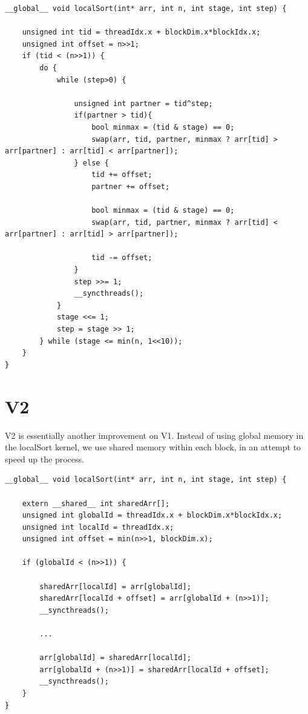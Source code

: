 \documentclass[12pt]{report}
\begin{document}
\begin{lstlisting}[style=cstyle]
__global__ void localSort(int* arr, int n, int stage, int step) {

    unsigned int tid = threadIdx.x + blockDim.x*blockIdx.x;
    unsigned int offset = n>>1;
    if (tid < (n>>1)) {
        do {
            while (step>0) {
                
                unsigned int partner = tid^step;
                if(partner > tid){
                    bool minmax = (tid & stage) == 0;
                    swap(arr, tid, partner, minmax ? arr[tid] > arr[partner] : arr[tid] < arr[partner]);
                } else {
                    tid += offset;
                    partner += offset;

                    bool minmax = (tid & stage) == 0;
                    swap(arr, tid, partner, minmax ? arr[tid] < arr[partner] : arr[tid] > arr[partner]);

                    tid -= offset;
                }
                step >>= 1;
                __syncthreads();
            }
            stage <<= 1;
            step = stage >> 1;
        } while (stage <= min(n, 1<<10));
    }
}
\end{lstlisting}

\section{V2}

V2 is essentially another improvement on V1. Instead of using global memory in the localSort kernel, we use shared memory within each block, in an attempt to speed up the process.

\begin{lstlisting}[style=cstyle]
__global__ void localSort(int* arr, int n, int stage, int step) {

    extern __shared__ int sharedArr[];
    unsigned int globalId = threadIdx.x + blockDim.x*blockIdx.x;
    unsigned int localId = threadIdx.x;
    unsigned int offset = min(n>>1, blockDim.x);

    if (globalId < (n>>1)) {
        
        sharedArr[localId] = arr[globalId];
        sharedArr[localId + offset] = arr[globalId + (n>>1)];
        __syncthreads(); 

        ...

        arr[globalId] = sharedArr[localId];
        arr[globalId + (n>>1)] = sharedArr[localId + offset];
        __syncthreads();
    }
}
\end{lstlisting}
\end{document}
